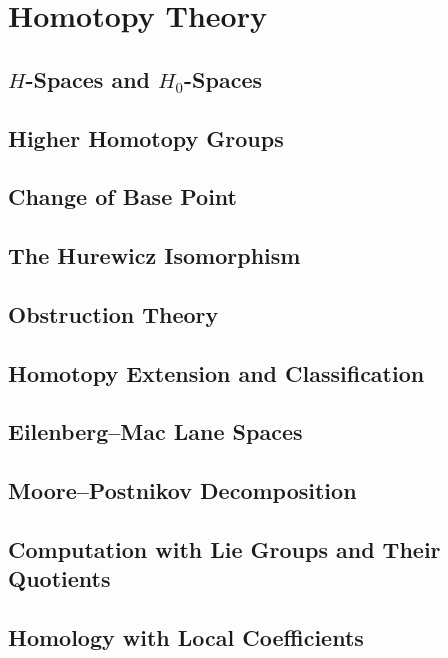 \documentclass[11pt, a4paper]{article}
\begin{document}
\section{Homotopy Theory}

\subsection{$H$-Spaces and $H_0$-Spaces}

\subsection{Higher Homotopy Groups}

\subsection{Change of Base Point}

\subsection{The Hurewicz Isomorphism}

\subsection{Obstruction Theory}

\subsection{Homotopy Extension and Classification}

\subsection{Eilenberg--Mac Lane Spaces}

\subsection{Moore--Postnikov Decomposition}

\subsection{Computation with Lie Groups and Their Quotients}

\subsection{Homology with Local Coefficients}
\end{document}
